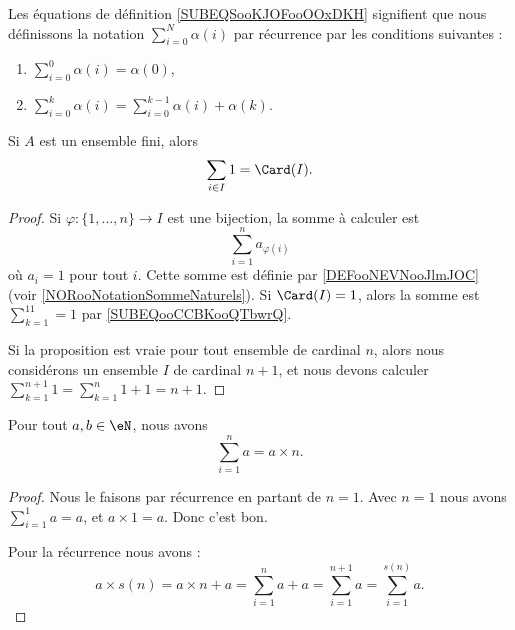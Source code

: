 \begin{normaltext}	\label{NORooNotationSommeNaturels}
	Les équations de définition \eqref{SUBEQSooKJOFooOOxDKH} signifient que nous définissons la notation \( \sum_{i=0}^N\alpha(i)\) par récurrence par les conditions suivantes :
	\begin{enumerate}
		\item       \label{ITEMooIPDTooEhOxea}
		      \( \sum_{i=0}^0\alpha(i)=\alpha(0)\),
		\item	\label{ITEMooSommeNaturelsSucc}
		      \( \sum_{i=0}^{k}\alpha(i)=\sum_{i=0}^{k-1}\alpha(i)+\alpha(k)\).
	\end{enumerate}
\end{normaltext}



\begin{lemma}	\label{LEMooVFNOooZenJSl}
	Si \( A\) est un ensemble fini, alors
	\begin{equation}
		\sum_{i\in I}1=\Card(I).
	\end{equation}
\end{lemma}

\begin{proof}
	Si \(\varphi \colon \{ 1,\ldots,n \}\to I  \) est une bijection, la somme à calculer est
	\begin{equation}
		\sum_{i=1}^na_{\varphi(i)}
	\end{equation}
	où \( a_i=1\) pour tout \( i\). Cette somme est définie par \ref{DEFooNEVNooJlmJOC} (voir \ref{NORooNotationSommeNaturels}). Si \( \Card(I)=1\), alors la somme est \( \sum_{k=1}^11=1\) par \eqref{SUBEQooCCBKooQTbwrQ}.

	Si la proposition est vraie pour tout ensemble de cardinal \( n\), alors nous considérons un ensemble \( I\) de cardinal \( n+1\), et nous devons calculer \( \sum_{k=1}^{n+1}1=\sum_{k=1}^n1+1=n+1\).
\end{proof}




\begin{proposition}        \label{PROPooXXGHooLafGsI}
	Pour tout \( a,b\in \eN\), nous avons
	\begin{equation}
		\sum_{i=1}^na=a\times n.
	\end{equation}
\end{proposition}

\begin{proof}
	Nous le faisons par récurrence en partant de \( n=1\). Avec \( n=1\) nous avons \( \sum_{i=1}^1a=a\), et \( a\times 1=a\). Donc c'est bon.

	Pour la récurrence nous avons :
	\begin{equation}
		a\times s(n)=a\times n+a=\sum_{i=1}^na+a=\sum_{i=1}^{n+1}a=\sum_{i=1}^{s(n)}a.
	\end{equation}
\end{proof}

